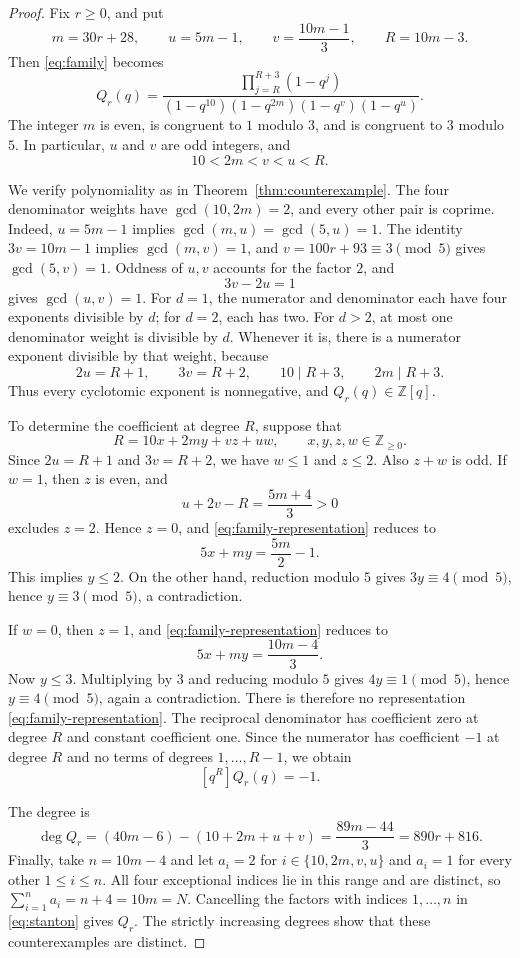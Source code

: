 \documentclass[11pt]{article}
\newcommand{\NN}{\mathbb Z_{\geq0}}
\begin{document}
\begin{proof}
Fix $r\geq0$, and put
\[
 m=30r+28,\qquad u=5m-1,\qquad v=\frac{10m-1}{3},
 \qquad R=10m-3.
\]
Then \eqref{eq:family} becomes
\[
 Q_r(q)=\frac{\prod_{j=R}^{R+3}(1-q^j)}
 {(1-q^{10})(1-q^{2m})(1-q^v)(1-q^u)}.
\]
The integer $m$ is even, is congruent to $1$ modulo $3$, and is
congruent to $3$ modulo $5$. In particular, $u$ and $v$ are odd
integers, and
\[
 10<2m<v<u<R.
\]

We verify polynomiality as in Theorem~\ref{thm:counterexample}.
The four denominator weights have
$\gcd(10,2m)=2$, and every other pair is coprime.
Indeed, $u=5m-1$ implies $\gcd(m,u)=\gcd(5,u)=1$.
The identity $3v=10m-1$ implies $\gcd(m,v)=1$, and
$v=100r+93\equiv3\pmod5$ gives $\gcd(5,v)=1$.
Oddness of $u,v$ accounts for the factor $2$, and
\[
 3v-2u=1
\]
gives $\gcd(u,v)=1$. For $d=1$, the numerator and denominator each
have four exponents divisible by $d$; for $d=2$, each has two.
For $d>2$, at most one denominator weight is divisible by $d$.
Whenever it is, there is a numerator exponent divisible by that weight,
because
\[
 2u=R+1,\qquad 3v=R+2,\qquad 10\mid R+3,
 \qquad 2m\mid R+3.
\]
Thus every cyclotomic exponent is nonnegative, and $Q_r(q)\in\mathbb Z[q]$.

To determine the coefficient at degree $R$, suppose that
\begin{equation}\label{eq:family-representation}
 R=10x+2my+vz+uw,\qquad x,y,z,w\in\NN.
\end{equation}
Since $2u=R+1$ and $3v=R+2$, we have $w\leq1$ and $z\leq2$.
Also $z+w$ is odd. If $w=1$, then $z$ is even, and
\[
 u+2v-R=\frac{5m+4}{3}>0
\]
excludes $z=2$. Hence $z=0$, and \eqref{eq:family-representation}
reduces to
\[
 5x+my=\frac{5m}{2}-1.
\]
This implies $y\leq2$. On the other hand, reduction modulo $5$ gives
$3y\equiv4\pmod5$, hence $y\equiv3\pmod5$, a contradiction.

If $w=0$, then $z=1$, and \eqref{eq:family-representation} reduces to
\[
 5x+my=\frac{10m-4}{3}.
\]
Now $y\leq3$. Multiplying by $3$ and reducing modulo $5$ gives
$4y\equiv1\pmod5$, hence $y\equiv4\pmod5$, again a contradiction.
There is therefore no representation \eqref{eq:family-representation}.
The reciprocal denominator has coefficient zero at degree $R$ and
constant coefficient one. Since the numerator has coefficient $-1$
at degree $R$ and no terms of degrees $1,\ldots,R-1$, we obtain
\[
 [q^R]Q_r(q)=-1.
\]

The degree is
\[
 \deg Q_r=(40m-6)-(10+2m+u+v)
         =\frac{89m-44}{3}=890r+816.
\]
Finally, take $n=10m-4$ and let $a_i=2$ for
$i\in\{10,2m,v,u\}$ and $a_i=1$ for every other $1\leq i\leq n$.
All four exceptional indices lie in this range and are distinct, so
$\sum_{i=1}^n a_i=n+4=10m=N$. Cancelling the factors with indices
$1,\ldots,n$ in \eqref{eq:stanton} gives $Q_r$.
The strictly increasing degrees show that these counterexamples are
distinct.
\end{proof}
\end{document}
